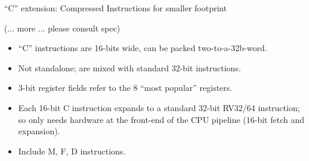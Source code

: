 \documentclass{article}
\begin{document}
\begin{center}
  {\Huge
    ``C'' extension: Compressed Instructions for smaller footprint}

  \vspace*{0.2in}

                                    

  \vspace*{0.1in}

  {\Large (... more ... please consult spec)}

  \vspace*{0.3in}

  \begin{minipage}{9in}\LARGE
    \begin{itemize}
    \item ``C'' instructions are 16-bits wide, can be packed two-to-a-32b-word.

    \item Not standalone; are mixed with standard 32-bit instructions.

    \item 3-bit register fields refer to the 8 ``most popular'' registers.

    \item Each 16-bit C instruction expands to a standard 32-bit RV32/64
      instruction; so only needs hardware at the front-end of the CPU
      pipeline (16-bit fetch and expansion).

    \item Include M, F, D instructions.
    \end{itemize}
  \end{minipage}
\end{center}

\clearpage

\end{document}
